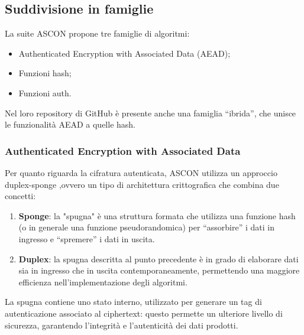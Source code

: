 \subsection{Suddivisione in famiglie}

La suite ASCON propone tre famiglie di algoritmi: \begin{itemize}
    \item Authenticated Encryption with Associated Data (AEAD);
    \item Funzioni hash;
    \item Funzioni auth.
\end{itemize}
\noindent Nel loro repository di GitHub\cite{github} è presente anche una famiglia ``ibrida'', che unisce le funzionalità AEAD a quelle hash.

\subsubsection{Authenticated Encryption with Associated Data}

Per quanto riguarda la cifratura autenticata, ASCON utilizza un approccio duplex-sponge\cite{ascon-specification} %
,ovvero un tipo di architettura crittografica che combina due concetti:
\begin{enumerate}[label=\Roman*.] %
    \item \textbf{Sponge}: la "spugna" è una struttura formata che utilizza una funzione hash (o in generale una funzione pseudorandomica) per ``assorbire'' i dati in ingresso e ``spremere'' i dati in uscita.
    \item \textbf{Duplex}: la spugna descritta al punto precedente è in grado di elaborare dati sia in ingresso che in uscita contemporaneamente, permettendo una maggiore efficienza nell'implementazione degli algoritmi.
\end{enumerate}
\noindent La spugna contiene uno stato interno, utilizzato per generare un tag di autenticazione associato al ciphertext: questo permette un ulteriore livello di sicurezza, garantendo l'integrità e l'autenticità dei dati prodotti. \\

